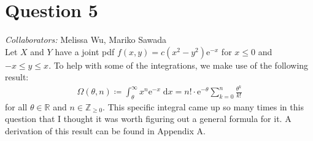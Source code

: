 \documentclass[10pt]{article}
\newcommand{\mycolab}[1]{\textcolor{colabcol}{\textsl{Collaborators:}} #1\\}
\begin{document}
\section{Question 5} \noindent
\mycolab{Melissa Wu, Mariko Sawada}
Let \(X\) and \(Y\) have a joint pdf \(f(x,y) = c(x^2 - y^2)\mathrm{e}^{-x}\) for \(x \le 0\) and \(-x \le y \le x\).
To help with some of the integrations, we make use of the following result:
\begin{align*}
    \Omega(\theta, n) \coloneqq \int_{\theta}^{\infty} x^n \mathrm{e}^{-x} \;\mathrm{d}x = n! \cdot \mathrm{e}^{-\theta} \sum_{k=0}^{n} \frac{\theta^k}{k!}
\end{align*}
for all \(\theta \in \mathbb{R}\) and \(n \in \mathbb{Z}_{\ge0}\). This specific integral came up so many times in this question that 
I thought it was worth figuring out a general formula for it. 
A derivation of this result can be found in Appendix A. 
\end{document}
